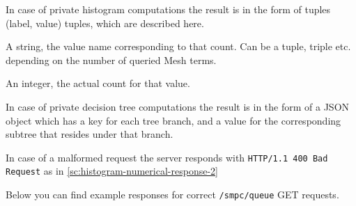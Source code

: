 \begin{itemize}
\begin{description}[labelwidth=4em, leftmargin=\dimexpr\labelwidth+\labelsep\relax]
\begin{description}[labelwidth=4em, leftmargin=\dimexpr\labelwidth+\labelsep\relax]
    In case of private histogram computations the result is in the form of tuples (label, value) tuples, which are described here.
    \begin{description}[labelwidth=4em, leftmargin=\dimexpr\labelwidth+\labelsep\relax]
        \item [\texttt{label}:] A string, the value name corresponding to that count. Can be a tuple, triple etc. depending on the number of queried Mesh terms.
        \item [\texttt{value}:] An integer, the actual count for that value.
    \end{description}
    In case of private decision tree computations the result is in the form of a JSON object which has a key for each tree branch, and a value for the corresponding subtree that resides under that branch.
\end{description}

In case of a malformed request the server responds with \texttt{HTTP/1.1 400 Bad Request} as in \ref{sc:histogram-numerical-response-2}

Below you can find example responses for correct \texttt{/smpc/queue} GET requests.



\end{description}
\end{itemize}
